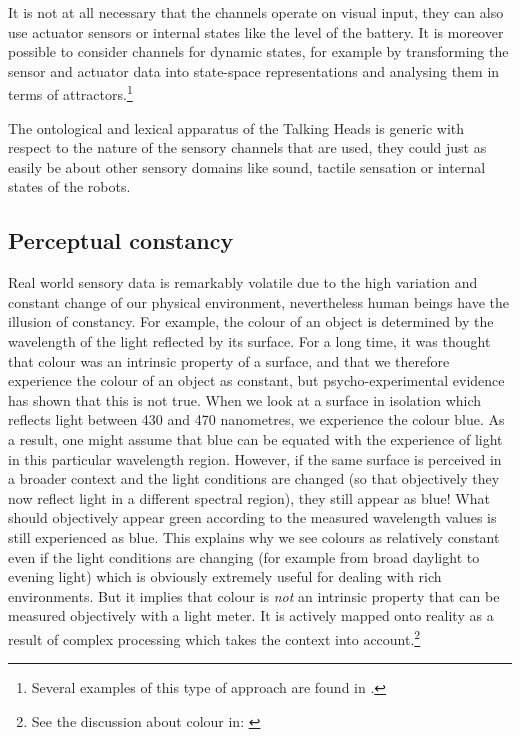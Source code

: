 It is not at all necessary that the channels operate 
on visual input, they can also use actuator sensors or internal states
like the level of the battery. It is moreover possible to 
consider channels for dynamic states, for 
example by transforming the sensor and actuator
data into state-space representations and 
analysing them in terms of attractors.\footnote{
Several examples of this type of approach are 
found in \cite{Port:1995}.}

The ontological and lexical apparatus of the Talking Heads is 
generic with respect to the nature of the sensory channels
that are used, they could just as easily be about other sensory 
domains like sound, tactile sensation or internal states
of the robots.

\subsection{Perceptual constancy}

Real world sensory data is remarkably volatile due to the 
high variation and constant change of 
our physical environment, nevertheless human beings have 
the illusion of constancy. 
For example, the colour of an object is determined 
by the wavelength of the light reflected by its surface. 
For a long time, it 
was thought that colour was an intrinsic property of a 
surface, and that we therefore experience the colour of 
an object as constant, but psycho-experimental evidence has shown 
that this is not true. When we look at a surface in 
isolation which reflects light between 
430 and 470 nanometres, we experience 
the colour blue. As a result, one might assume
that blue can be equated
with the experience of light in this particular wavelength 
region. However, if the same surface is perceived
in a broader context and the light conditions 
are changed (so that objectively they now 
reflect light in a different spectral region), they still 
appear as blue! What should objectively 
appear green according to the measured wavelength 
values is still experienced
as blue. This explains why we see colours
as relatively constant even if the light conditions
are changing (for example from broad daylight to 
evening light) which is obviously extremely useful 
for dealing with rich environments. But it 
implies that colour is {\itshape not}
an intrinsic property that can be measured objectively 
with a light meter. It is actively mapped onto reality 
as a result of complex processing which takes the 
context into account.\footnote{
See the discussion about colour 
in: \cite{Varela:1991}}

